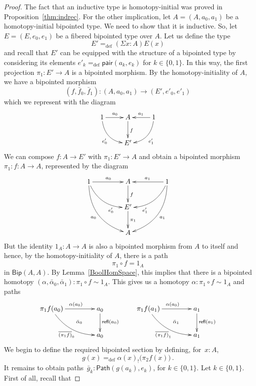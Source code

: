 \documentclass[10pt,a4paper,oneside,reqno]{amsart}
\numberwithin{equation}{section}
\theoremstyle{mythm}
\theoremstyle{mydef}
\theoremstyle{myrmk}
\newcommand{\defeq}{=_{\mathrm{def}}}
\newcommand{\co}{\colon}
\newcommand{\pair}{\mathsf{pair}}
\newcommand{\Id}{\mathsf{Path}}
\newcommand{\refl}{\mathsf{refl}}
\newcommand{\Bip}{\mathsf{Bip}}
\begin{document}
\begin{proof} The fact that an inductive type is homotopy-initial was proved in 
Proposition~\ref{thm:indrec}. For the other implication, 
let $A = (A, a_0, a_1)$ be a homotopy-initial bipointed type. We need to show that it is inductive. 
So, let $E = (E, e_0, e_1)$ be a fibered bipointed type over $A$. Let us define the type 
\[
E' \defeq (\Sigma x \co A) E(x) 
\]
and recall that $E'$ can be equipped with the structure of a bipointed type by considering its elements $e'_k \defeq \pair(a_k, e_k)$ for $k \in \{0, 1\}$. In this way,  the first projection $\pi_1 \co E' \to A$ is a bipointed morphism. By the homotopy-initiality of $A$, we have a bipointed morphism 
\[
(f, \bar{f}_0, \bar{f}_1) \co (A, a_0, a_1)  \to (E', e'_0, e'_1) 
\]
which we represent with the diagram
\[
\xymatrix{
1 \ar@/_1pc/[dr]_{e'_0} \ar[r]^{a_0} & A  \ar[d]^f & 1 \ar[l]_{a_1} \ar@/^1pc/[dl]^{e'_1} \\
 & E' & }
 \]
 We can compose $f \co A \to E'$ with $\pi_1 \co E' \to A$ and obtain a bipointed morphism $\pi_1 \co f \co A \to A$, represented by the diagram
  \[
\xymatrix@C=1.5cm{
1 \ar@/_1pc/[dr]_(.7){e'_0} \ar[r]^{a_0} \ar@/_1.5pc/[ddr]_{a_0}  & A  \ar[d]^f & 1 \ar[l]_{a_1} \ar@/^1pc/[dl]^(.7){e'_1} \ar@/^1.5pc/[ddl]^{a_1}  \\
 & E' \ar[d]^{\pi_1} & \\
 & A &  }
 \]
But the identity $1_A \co A \to A$ is also a bipointed morphism from $A$ to itself and hence, by the homotopy-initiality of $A$, there is a path
\[
\pi_1 \circ f = 1_A 
\]
in $\Bip(A,A)$. By Lemma~\ref{BoolHomSpace}, this implies that there  is a bipointed homotopy $(\alpha,
\bar{\alpha}_0,\bar{\alpha}_1) \co \pi_1 \circ f \sim 1_A$. This gives us a homotopy $\alpha \co \pi_1 \circ f \sim 1_A$ and paths
\[
\xymatrix@C=1.5cm{
\pi_1 f (a_0) \ar[r]^{\alpha(a_0)} \ar@/_1pc/[dr]_{\overline{(\pi_1 f)}_0} \ar@{}[dr]|{\quad \bar{\alpha}_0}  & a_0 \ar[d]^{\refl(a_0)} \\
 & a_0 } \qquad
 \xymatrix@C=1.5cm{
\pi_1 f (a_1) \ar[r]^{\alpha(a_0)} \ar@/_1pc/[dr]_{\overline{(\pi_1 f)}_1} \ar@{}[dr]|{\quad \bar{\alpha}_1}  & a_1 \ar[d]^{\refl(a_1)} \\
 & a_1 }
\]
We begin to define the required bipointed section by defining, for~$x \co A$, 
\begin{equation}
\label{equ:defreqsection}
g(x) \defeq \alpha(x)_{!} \big( \pi_2 f (x) \big) \, .
\end{equation}
It remains to obtain paths~$\bar{g}_k \co \Id( g(a_k), e_k)$, for $k \in \{0, 1\}$.  Let $k \in \{0, 1\}$. First of all, recall that 

\end{proof}
\end{document}
